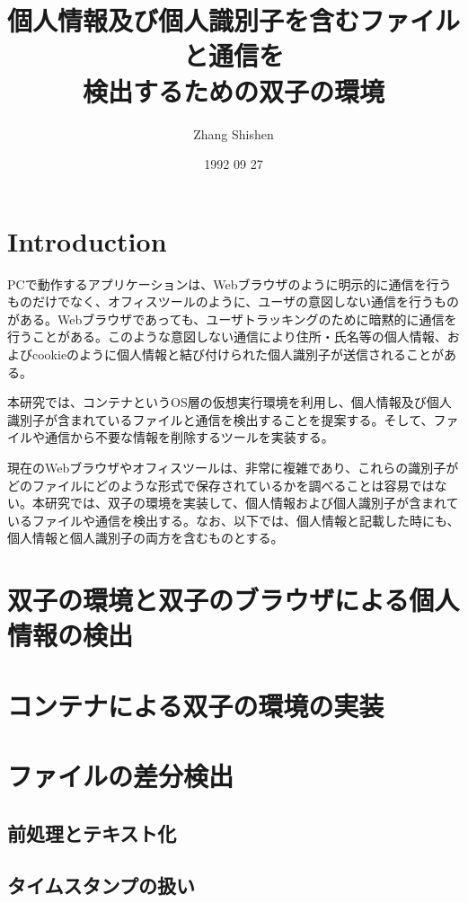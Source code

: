 \documentclass{jreport}
\begin{document}
\title{個人情報及び個人識別子を含むファイルと通信を\\検出するための双子の環境}
\author{Zhang Shishen}
\date{1992 09 27}


\maketitle



\chapter*{Introduction}
PCで動作するアプリケーションは、Webブラウザのように明示的に通信を行うものだけでなく、オフィスツールのように、ユーザの意図しない通信を行うものがある。Webブラウザであっても、ユーザトラッキングのために暗黙的に通信を行うことがある。このような意図しない通信により住所・氏名等の個人情報、およびcookieのように個人情報と結び付けられた個人識別子が送信されることがある。

本研究では、コンテナというOS層の仮想実行環境を利用し、個人情報及び個人識別子が含まれているファイルと通信を検出することを提案する\cite{web}。そして、ファイルや通信から不要な情報を削除するツールを実装する。

現在のWebブラウザやオフィスツールは、非常に複雑であり、これらの識別子がどのファイルにどのような形式で保存されているかを調べることは容易ではない。本研究では、双子の環境を実装して、個人情報および個人識別子が含まれているファイルや通信を検出する。なお、以下では、個人情報と記載した時にも、個人情報と個人識別子の両方を含むものとする。
\tableofcontents
\chapter{双子の環境と双子のブラウザによる個人情報の検出}
\chapter{コンテナによる双子の環境の実装}
\chapter{ファイルの差分検出}
\section{前処理とテキスト化}
\section{タイムスタンプの扱い}
\end{document}
